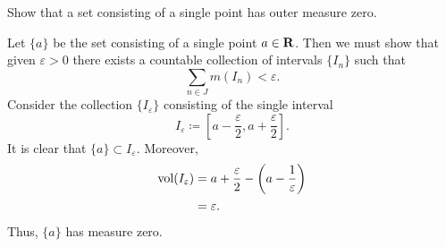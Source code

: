\begin{problem}
  Show that a set consisting of a single point has outer measure zero.
\end{problem}
\begin{solution}
  Let $\{a\}$ be the set consisting of a single point $a\in\mathbf{R}$. Then we
  must show that given $\varepsilon>0$ there exists a countable collection
  of intervals $\{I_n\}$ such that
  \[
    \sum_{n\in J} m(I_n)<\varepsilon.
  \]
  Consider the collection $\{I_\varepsilon\}$ consisting of the single
  interval
  \[
    I_\varepsilon\coloneq
    \left[a-\frac{\varepsilon}{2},a+\frac{\varepsilon}{2}\right].
  \]
  It is clear that $\{a\}\subset I_\varepsilon$. Moreover,
  \begin{align*}
    \operatorname{vol}(I_\varepsilon)
    &=a+\frac{\varepsilon}{2}-\left(a-\frac{1}{\varepsilon}\right)\\
    &=\varepsilon.
  \end{align*}
  Thus, $\{a\}$ has measure zero.
\end{solution}

